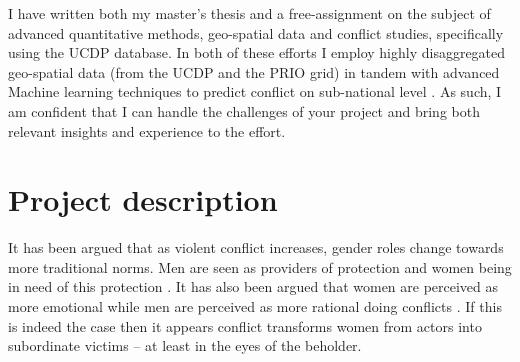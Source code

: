 \documentclass[a4paper]{article}
\begin{document}
I have written both my master's thesis \citep{SPECIALE} and a free-assignment \citep{Maase} on the subject of advanced quantitative methods, geo-spatial data and conflict studies, specifically using the UCDP database. In both of these efforts I employ highly disaggregated geo-spatial data (from the UCDP and the PRIO grid) in tandem with advanced Machine learning techniques to predict conflict on sub-national level \cite{Maase, SPECIALE}. As such, I am confident that I can handle the challenges of your project and bring both relevant insights and experience to the effort.\par


\section{Project description}




It has been argued that as violent conflict increases, gender roles change towards more traditional norms. Men are seen as providers of protection and women being in need of this protection \citep{elshtain1995women, carpenter2003women}. It has also been argued that women are perceived as more emotional while men are perceived as more rational doing conflicts \citep{elshtain1993public}. If this is indeed the case then it appears conflict transforms women from actors into subordinate victims -- at least in the eyes of the beholder.\par 
\end{document}
